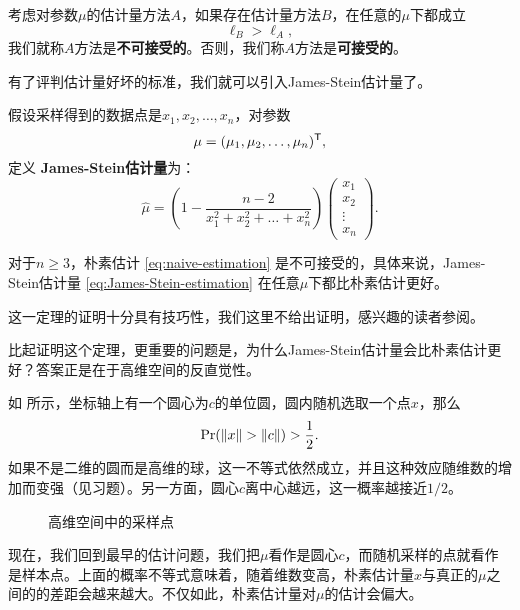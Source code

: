 \begin{definition}[可接受性]
考虑对参数$\mu$的估计量方法$A$，如果存在估计量方法$B$，在任意的$\mu$下都成立
\[\ell_B > \ell_A,\]
我们就称$A$方法是\textbf{不可接受的}。否则，我们称$A$方法是\textbf{可接受的}。
\end{definition}

有了评判估计量好坏的标准，我们就可以引入James-Stein估计量了。

\begin{definition}
假设采样得到的数据点是$x_1,x_2,\dots,x_n$，对参数
\[\mu=(\mu_1,\mu_2,\dots,\mu_n)^{\mathsf{T}},\]
定义 \textbf{James-Stein估计量}为：
\begin{equation}
    \hat{\mu} = \left(1 - \frac{n-2}{x_1^2+x_2^2+\dots+x_n^2}\right)\begin{pmatrix}
        x_1 \\ x_2 \\ \vdots \\ x_n
        \end{pmatrix}.\label{eq:James-Stein-estimation}        
\end{equation}
\end{definition}

\begin{theorem}[Stein悖论]\label{thm:stein-paradox}
    对于$n\geq 3$，朴素估计 \eqref{eq:naive-estimation} 是不可接受的，具体来说，James-Stein估计量 \eqref{eq:James-Stein-estimation} 在任意$\mu$下都比朴素估计更好。
\end{theorem}

这一定理的证明十分具有技巧性，我们这里不给出证明，感兴趣的读者参阅。

比起证明这个定理，更重要的问题是，为什么James-Stein估计量会比朴素估计更好？答案正是在于高维空间的反直觉性。

如 所示，坐标轴上有一个圆心为$c$的单位圆，圆内随机选取一个点$x$，那么
\[
\Pr(\left\|x\right\| > \left\|c\right\|) > \frac{1}{2}.
\]
如果不是二维的圆而是高维的球，这一不等式依然成立，并且这种效应随维数的增加而变强（见习题）。另一方面，圆心$c$离中心越远，这一概率越接近$1/2$。

\begin{figure}[ht]
    \centering
    \caption{高维空间中的采样点}
    \label{fig:circle-sample}
\end{figure}

现在，我们回到最早的估计问题，我们把$\mu$看作是圆心$c$，而随机采样的点就看作是样本点。上面的概率不等式意味着，随着维数变高，朴素估计量$x$与真正的$\mu$之间的的差距会越来越大。不仅如此，朴素估计量对$\mu$的估计会偏大。

